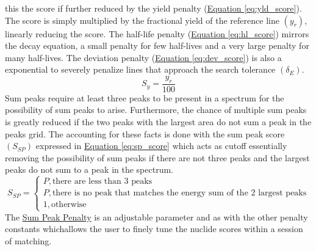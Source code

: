 \documentclass[12pt,report,justified]{SANDreport}
\begin{document}
this the score if further reduced by the yield penalty (\hyperref[eq:yld_score]{Equation \ref{eq:yld_score}}).
The score is simply multiplied by the fractional yield of the reference line \(\left( y_r\right)\), linearly
reducing the score. The half-life penalty (\hyperref[eq:hl_score]{Equation \ref{eq:hl_score}}) mirrors the
decay equation, a small penalty for few half-lives and a very large penalty for many half-lives. The deviation
penalty (\hyperref[eq:dev_score]{Equation \ref{eq:dev_score}}) is also a exponential to severely penalize
lines that approach the search tolerance \(\left( \delta _E \right)\).
\begin{equation}
S_y = \frac{y_r}{100}
\label{eq:yld_score}
\end{equation}
Sum peaks require at least three peaks to be present in a spectrum for the possibility of sum peaks
to arise. Furthermore, the chance of multiple sum peaks is greatly reduced if the two peaks with
the largest area do not sum a peak in the peaks grid. The accounting for these facts is done with
the sum peak score \(\left( S_{SP} \right)\) expressed in \hyperref[eq:sp_score]{Equation \ref{eq:sp_score}}
which acts as cutoff essentially removing the possibility of sum peaks if there are not three peaks and the
largest peaks do not sum to a peak in the spectrum.
\begin{equation}
S_{SP} =
\begin{cases}
P, \text{there are less than 3 peaks} \\
P, \text{there is no peak that matches the energy sum of the 2 largest peaks} \\
1, \text{otherwise}
\end{cases}
\label{eq:sp_score}
\end{equation}
The \hyperref[itm:sm_peak_pen]{Sum Peak Penalty} is an adjustable parameter and as with the other
penalty constants whichallows the user to finely tune the nuclide scores within a session of matching.
\end{document}
